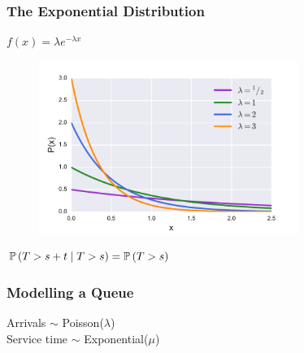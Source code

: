 \documentclass{beamer}
\begin{document}
\begin{frame}
\frametitle{The Exponential Distribution}
\begin{center}
$f(x) = \lambda e^{-\lambda x}$
\begin{figure}
\includegraphics[width=0.75\textwidth]{expon_dist}
\end{figure}
$\mathbb{P}\left(T > s + t \nonscript\; | \nonscript\; T > s\right) = \mathbb{P}\left(T > s\right)$
\end{center}
\end{frame}


\begin{frame}
\frametitle{Modelling a Queue}
\begin{figure}
  
\end{figure}

\begin{tcolorbox}[colback=orange!25!yellow!25,colframe=orange!50!yellow]
\begin{center}
Arrivals $\sim$ Poisson($\lambda$)\\
Service time $\sim$ Exponential($\mu$)
\end{center}
\end{tcolorbox}
\end{frame}




\begin{frame}
\begin{figure}
  
\end{figure}
\end{frame}
\end{document}
